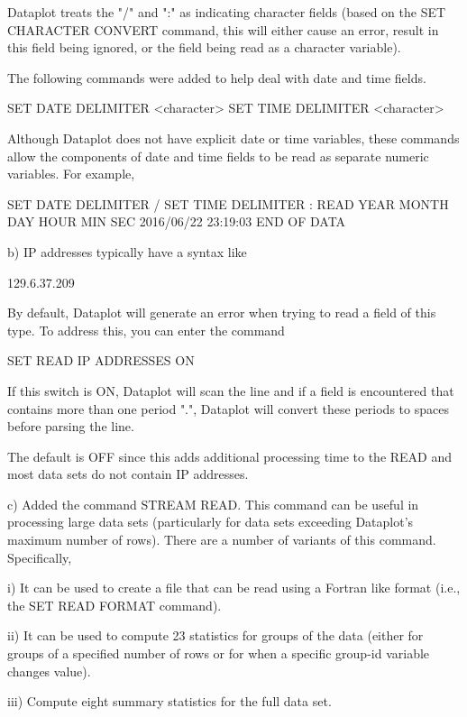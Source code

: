        Dataplot treats the "/" and ":" as indicating character fields
       (based on the SET CHARACTER CONVERT command, this will either cause
       an error, result in this field being ignored, or the field being
       read as a character variable).

       The following commands were added to help deal with date and
       time fields.

          SET DATE DELIMITER <character>
          SET TIME DELIMITER <character>

       Although Dataplot does not have explicit date or time variables,
       these commands allow the components of date and time fields to
       be read as separate numeric variables.  For example,

          SET DATE DELIMITER /
          SET TIME DELIMITER :
          READ YEAR MONTH DAY HOUR MIN SEC
          2016/06/22  23:19:03
          END OF DATA

    b) IP addresses typically have a syntax like

         129.6.37.209

       By default, Dataplot will generate an error when trying to read a
       field of this type.  To address this, you can enter the command

          SET READ IP ADDRESSES ON

       If this switch is ON, Dataplot will scan the line and if a field is
       encountered that contains more than one period ".", Dataplot will
       convert these periods to spaces before parsing the line.

       The default is OFF since this adds additional processing time to
       the READ and most data sets do not contain IP addresses.

    c) Added the command STREAM READ.  This command can be useful
       in processing large data sets (particularly for data sets
       exceeding Dataplot's maximum number of rows).  There are a
       number of variants of this command.  Specifically,

          i) It can be used to create a file that can be read
             using a Fortran like format (i.e., the SET READ
             FORMAT command).

         ii) It can be used to compute 23 statistics for groups
             of the data (either for groups of a specified number
             of rows or for when a specific group-id variable
             changes value).

        iii) Compute eight summary statistics for the full data
             set.

